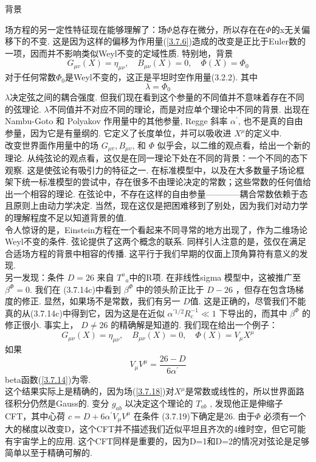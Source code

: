 \centerline{\Large 背景}
场方程的另一定性特征现在能够理解了：场$\Phi$总存在微分，所以存在在$\Phi$的x无关偏移下的不变. 这是因为这样的偏移为作用量(\ref{3.7.6})造成的改变是正比于Euler数的一项，因而并不影响类似Weyl不变的定域性质.
特别地，背景
\begin{equation}
G_{\mu v}(X)=\eta_{\mu \nu}, \quad B_{\mu \nu}(X)=0, \quad \Phi(X)=\Phi_{0}
\end{equation}
对于任何常数$\Phi_0$是Weyl不变的，这正是平坦时空作用量(3.2.2). 其中
\begin{equation}
\lambda=\Phi_{0}
\end{equation}
$\lambda$决定弦之间的耦合强度. 但我们现在看到这个参量的不同值并不意味着存在不同的弦理论.  $\lambda$不同值并不对应不同的理论，而是对应单个理论中不同的背景. 出现在 Nambu-Goto 和 Polyakov 作用量中的其他参量, Regge 斜率 $\alpha^{\prime}$, 也不是真的自由参量，因为它是有量纲的. 它定义了长度单位，并可以吸收进 $X^{\mu}$的定义中. \\
改变世界面作用量中的场 $G_{\mu v}, B_{\mu v}$, 和 $\Phi$ 似乎会，以二维的观点看，给出一个新的理论. 从纯弦论的观点看，这仅是在同一理论下处在不同的背景：一个不同的态下观察. 这是使弦论有吸引力的特征之一. 在标准模型中，以及在大多数量子场论框架下统一标准模型的尝试中，存在很多不由理论决定的常数；这些常数的任何值给出一个相容的理论. 在弦论中，不存在这样的自由参量————耦合常数依赖于态且原则上由动力学决定. 当然，现在这仅是把困难移到了别处，因为我们对动力学的理解程度不足以知道背景的值.\\
令人惊讶的是，Einstein方程在一个看起来不同寻常的地方出现了，作为二维场论Weyl不变的条件. 弦论提供了这两个概念的联系. 同样引人注意的是，弦仅在满足合适场方程的背景中相容的传播. 这平行于我们早期的仅面上顶角算符有意义的发现.\\
另一发现：条件 $D=26$ 来自 $T^{a}{ }_{a}$中的R项. 在非线性sigma 模型中，这被推广至 $\beta^{\Phi}=0$. 我们在 (3.7.14c)中看到  $\beta^{\Phi}$ 中的领头阶正比于 $D-26$ ，但存在包含场梯度的修正. 显然，如果场不是常数，我们有另一 $D$值. 这是正确的，尽管我们不能真的从(3.7.14c)中得到它，因为这是在近似 $\alpha^{\prime 1 / 2} R_{\mathrm{c}}^{-1} \ll 1$ 下导出的，而其中 $\beta^{\Phi}$ 的修正很小. 事实上， $D \neq 26$ 的精确解是知道的. 我们现在给出一个例子：
\begin{equation}\label{3.7.18}
G_{\mu \nu}(X)=\eta_{\mu \nu}, \quad B_{\mu \nu}(X)=0, \quad \Phi(X)=V_{\mu} X^{\mu}
\end{equation}
如果
\begin{equation}
V_{\mu} V^{\mu}=\frac{26-D}{6 \alpha^{\prime}}
\end{equation}
beta函数(\ref{3.7.14})为零. \\
这个结果实际上是精确的，因为场(\ref{3.7.18})对$X^\mu$是常数或线性的，所以世界面路径积分仍然是Gauss的. 变分 $g_{a b}$ 以决定这个理论的 $T_{a b}$ , 发现他正是伸缩子 CFT，其中心荷 $c=D+6 \alpha^{\prime} V_{\mu} V^{\mu}$ 在条件 (3.7.19)下确定是26. 由于$\Phi$ 必须有一个大的梯度以改变D，这个CFT并不描述我们近似平坦且齐次的4维时空，但它可能有宇宙学上的应用. 这个CFT同样是重要的，因为D=1和D=2的情况对弦论是足够简单以至于精确可解的.\\

